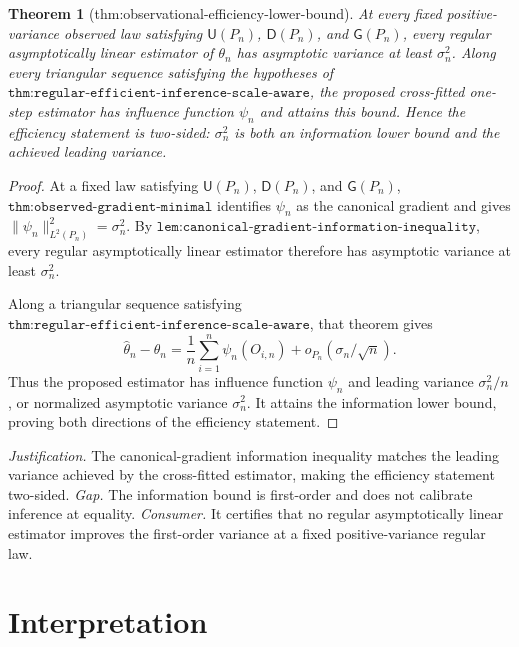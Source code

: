 \documentclass{article}
\newtheorem{theorem}{Theorem}
\begin{document}
\begin{theorem}[thm:observational-efficiency-lower-bound]\label{thm:observational-efficiency-lower-bound}
At every fixed positive-variance observed law satisfying \(\mathsf U(P_n)\), \(\mathsf D(P_n)\), and \(\mathsf G(P_n)\), every regular asymptotically linear estimator of \(\theta_n\) has asymptotic variance at least \(\sigma_n^2\). Along every triangular sequence satisfying the hypotheses of \(\texttt{thm:regular-efficient-inference-scale-aware}\), the proposed cross-fitted one-step estimator has influence function \(\psi_n\) and attains this bound. Hence the efficiency statement is two-sided: \(\sigma_n^2\) is both an information lower bound and the achieved leading variance.
\end{theorem}
\begin{proof}
At a fixed law satisfying \(\mathsf U(P_n)\), \(\mathsf D(P_n)\), and \(\mathsf G(P_n)\), \(\texttt{thm:observed-gradient-minimal}\) identifies \(\psi_n\) as the canonical gradient and gives \(\lVert\psi_n\rVert_{L^2(P_n)}^2=\sigma_n^2\). By \(\texttt{lem:canonical-gradient-information-inequality}\), every regular asymptotically linear estimator therefore has asymptotic variance at least \(\sigma_n^2\).

Along a triangular sequence satisfying \(\texttt{thm:regular-efficient-inference-scale-aware}\), that theorem gives
\[\widehat\theta_n-\theta_n=\frac1n\sum_{i=1}^n\psi_n(O_{i,n})+o_{P_n}(\sigma_n/\sqrt n).\]
Thus the proposed estimator has influence function \(\psi_n\) and leading variance \(\sigma_n^2/n\), or normalized asymptotic variance \(\sigma_n^2\). It attains the information lower bound, proving both directions of the efficiency statement.
\end{proof}
\par\smallskip\noindent \textit{Justification.} The canonical-gradient information inequality matches the leading variance achieved by the cross-fitted estimator, making the efficiency statement two-sided. \textit{Gap.} The information bound is first-order and does not calibrate inference at equality. \textit{Consumer.} It certifies that no regular asymptotically linear estimator improves the first-order variance at a fixed positive-variance regular law.

\section{Interpretation}
\end{document}
